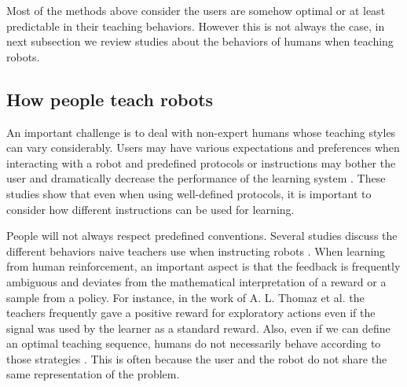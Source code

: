 Most of the methods above consider the users are somehow optimal or at least predictable in their teaching behaviors. However this is not always the case, in next subsection we review studies about the behaviors of humans when teaching robots.

\subsection{How people teach robots}

An important challenge is to deal with non-expert humans whose teaching styles can vary considerably. Users may have various expectations and preferences when interacting with a robot and predefined protocols or instructions may bother the user and dramatically decrease the performance of the learning system \cite{thomaz2008teachable,kaochar2011towards,knox2012humans,rouanet2013impact}. These studies show that even when using well-defined protocols, it is important to consider how different instructions can be used for learning.

People will not always respect predefined conventions. Several studies discuss the different behaviors naive teachers use when instructing robots \cite{thomaz2008teachable,Cakmak2010optimality}. When learning from human reinforcement, an important aspect is that the feedback is frequently ambiguous and deviates from the mathematical interpretation of a reward or a sample from a policy. For instance, in the work of A. L. Thomaz et al. \cite{thomaz2008teachable} the teachers frequently gave a positive reward for exploratory actions even if the signal was used by the learner as a standard reward. Also, even if we can define an optimal teaching sequence, humans do not necessarily behave according to those strategies \cite{Cakmak2010optimality}. This is often because the user and the robot do not share the same representation of the problem.

